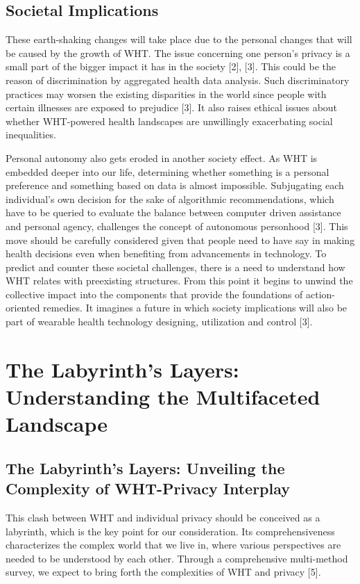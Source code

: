 \documentclass[11pt]{article}
\begin{document}
\subsection{Societal Implications}

These earth-shaking changes will take place due to the personal changes that will be caused by the growth of WHT. The issue concerning one person’s privacy is a small part of the bigger impact it has in the society [2], [3]. This could be the reason of discrimination by aggregated health data analysis. Such discriminatory practices may worsen the existing disparities in the world since people with certain illnesses are exposed to prejudice [3]. It also raises ethical issues about whether WHT-powered health landscapes are unwillingly exacerbating social inequalities.

Personal autonomy also gets eroded in another society effect. As WHT is embedded deeper into our life, determining whether something is a personal preference and something based on data is almost impossible. Subjugating each individual’s own decision for the sake of algorithmic recommendations, which have to be queried to evaluate the balance between computer driven assistance and personal agency, challenges the concept of autonomous personhood [3]. This move should be carefully considered given that people need to have say in making health decisions even when benefiting from advancements in technology. To predict and counter these societal challenges, there is a need to understand how WHT relates with preexisting structures. From this point it begins to unwind the collective impact into the components that provide the foundations of action-oriented remedies. It imagines a future in which society implications will also be part of wearable health technology designing, utilization and control [3].

\section{The Labyrinth's Layers: Understanding the Multifaceted Landscape}

\subsection{The Labyrinth's Layers: Unveiling the Complexity of WHT-Privacy Interplay}

This clash between WHT and individual privacy should be conceived as a labyrinth, which is the key point for our consideration. Its comprehensiveness characterizes the complex world that we live in, where various perspectives are needed to be understood by each other. Through a comprehensive multi-method survey, we expect to bring forth the complexities of WHT and privacy [5].
\end{document}
